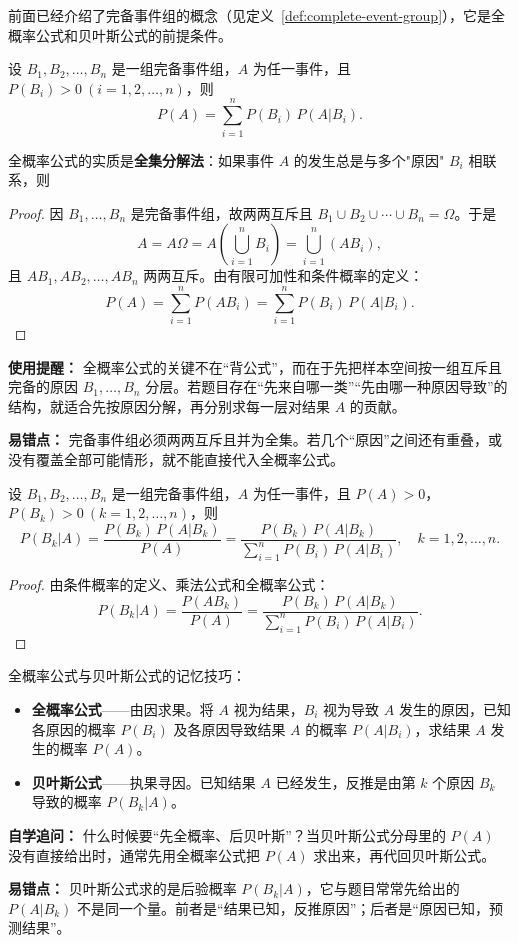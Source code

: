 ﻿\documentclass[lang=cn,11pt]{elegantbook}
\begin{document}
前面已经介绍了完备事件组的概念（见定义~\ref{def:complete-event-group}），它是全概率公式和贝叶斯公式的前提条件。

\begin{theorem}[全概率公式] \label{thm:total-probability}
设 \(B_1, B_2, \dots, B_n\) 是一组完备事件组，\(A\) 为任一事件，且 \(P(B_i) > 0\ (i=1,2,\dots,n)\)，则
\[
P(A) = \sum_{i=1}^{n} P(B_i)\,P(A|B_i).
\]
\end{theorem}

全概率公式的实质是\textbf{全集分解法}：如果事件 \(A\) 的发生总是与多个"原因" \(B_i\) 相联系，则
\begin{proof}
因 \(B_1, \dots, B_n\) 是完备事件组，故两两互斥且 \(B_1 \cup B_2 \cup \cdots \cup B_n = \Omega\)。于是
\[
A = A\Omega = A\!\left(\bigcup_{i=1}^{n} B_i\right) = \bigcup_{i=1}^{n} (AB_i),
\]
且 \(AB_1, AB_2, \dots, AB_n\) 两两互斥。由有限可加性和条件概率的定义：
\[
P(A) = \sum_{i=1}^{n} P(AB_i) = \sum_{i=1}^{n} P(B_i)\,P(A|B_i).
\]
\end{proof}

\begin{note}
\textbf{使用提醒：} 全概率公式的关键不在“背公式”，而在于先把样本空间按一组互斥且完备的原因 \(B_1,\dots,B_n\) 分层。若题目存在“先来自哪一类”“先由哪一种原因导致”的结构，就适合先按原因分解，再分别求每一层对结果 \(A\) 的贡献。

\textbf{易错点：} 完备事件组必须两两互斥且并为全集。若几个“原因”之间还有重叠，或没有覆盖全部可能情形，就不能直接代入全概率公式。
\end{note}

\begin{theorem}[贝叶斯公式] \label{thm:bayes}
设 \(B_1, B_2, \dots, B_n\) 是一组完备事件组，\(A\) 为任一事件，且 \(P(A) > 0\)，\(P(B_k) > 0\ (k=1,2,\dots,n)\)，则
\[
P(B_k|A) = \frac{P(B_k)\,P(A|B_k)}{P(A)} = \frac{P(B_k)\,P(A|B_k)}{\sum_{i=1}^{n} P(B_i)\,P(A|B_i)}, \quad k=1,2,\dots,n.
\]
\end{theorem}
\begin{proof}
由条件概率的定义、乘法公式和全概率公式：
\[
P(B_k|A) = \frac{P(AB_k)}{P(A)} = \frac{P(B_k)\,P(A|B_k)}{\displaystyle\sum_{i=1}^{n} P(B_i)\,P(A|B_i)}.
\]
\end{proof}

\begin{note}
全概率公式与贝叶斯公式的记忆技巧：
\begin{itemize}
    \item \textbf{全概率公式}——由因求果。将 \(A\) 视为结果，\(B_i\) 视为导致 \(A\) 发生的原因，已知各原因的概率 \(P(B_i)\) 及各原因导致结果 \(A\) 的概率 \(P(A|B_i)\)，求结果 \(A\) 发生的概率 \(P(A)\)。
    \item \textbf{贝叶斯公式}——执果寻因。已知结果 \(A\) 已经发生，反推是由第 \(k\) 个原因 \(B_k\) 导致的概率 \(P(B_k|A)\)。
\end{itemize}

\textbf{自学追问：} 什么时候要“先全概率、后贝叶斯”？当贝叶斯公式分母里的 \(P(A)\) 没有直接给出时，通常先用全概率公式把 \(P(A)\) 求出来，再代回贝叶斯公式。

\textbf{易错点：} 贝叶斯公式求的是后验概率 \(P(B_k|A)\)，它与题目常常先给出的 \(P(A|B_k)\) 不是同一个量。前者是“结果已知，反推原因”；后者是“原因已知，预测结果”。
\end{note}
\end{document}
